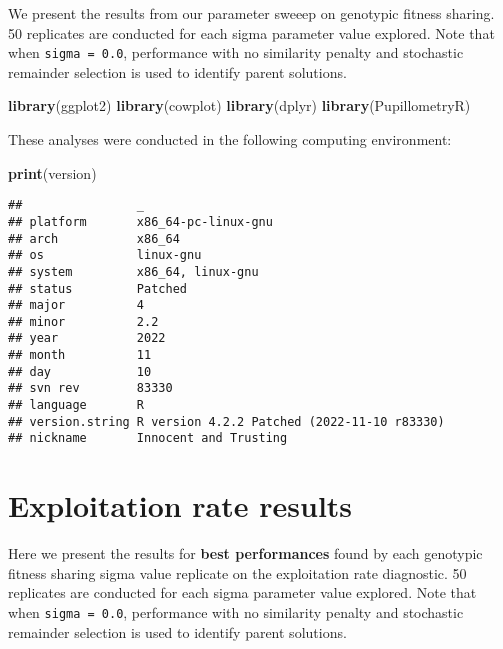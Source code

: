 \documentclass[]{book}
\newenvironment{Shaded}{\begin{snugshade}}{\end{snugshade}}
\newcommand{\KeywordTok}[1]{\textcolor[rgb]{0.13,0.29,0.53}{\textbf{#1}}}
\newcommand{\NormalTok}[1]{#1}
\begin{document}
We present the results from our parameter sweeep on genotypic fitness sharing.
50 replicates are conducted for each sigma parameter value explored.
Note that when \texttt{sigma\ =\ 0.0}, performance with no similarity penalty and stochastic remainder selection is used to identify parent solutions.

\begin{Shaded}
\begin{Highlighting}[]
\KeywordTok{library}\NormalTok{(ggplot2)}
\KeywordTok{library}\NormalTok{(cowplot)}
\KeywordTok{library}\NormalTok{(dplyr)}
\KeywordTok{library}\NormalTok{(PupillometryR)}
\end{Highlighting}
\end{Shaded}

These analyses were conducted in the following computing environment:

\begin{Shaded}
\begin{Highlighting}[]
\KeywordTok{print}\NormalTok{(version)}
\end{Highlighting}
\end{Shaded}

\begin{verbatim}
##                _                                          
## platform       x86_64-pc-linux-gnu                        
## arch           x86_64                                     
## os             linux-gnu                                  
## system         x86_64, linux-gnu                          
## status         Patched                                    
## major          4                                          
## minor          2.2                                        
## year           2022                                       
## month          11                                         
## day            10                                         
## svn rev        83330                                      
## language       R                                          
## version.string R version 4.2.2 Patched (2022-11-10 r83330)
## nickname       Innocent and Trusting
\end{verbatim}

\hypertarget{exploitation-rate-results-3}{%
\section{Exploitation rate results}\label{exploitation-rate-results-3}}

Here we present the results for \textbf{best performances} found by each genotypic fitness sharing sigma value replicate on the exploitation rate diagnostic.
50 replicates are conducted for each sigma parameter value explored.
Note that when \texttt{sigma\ =\ 0.0}, performance with no similarity penalty and stochastic remainder selection is used to identify parent solutions.
\end{document}
